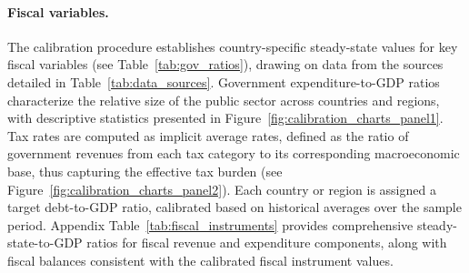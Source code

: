 \documentclass[a4paper,11pt]{article}
\numberwithin{equation}{section}
\begin{document}

\paragraph{Fiscal variables.}
The calibration procedure establishes country-specific steady-state values for key fiscal variables (see Table~\ref{tab:gov_ratios}), drawing on data from the sources detailed in Table~\ref{tab:data_sources}.
Government expenditure-to-GDP ratios characterize the relative size of the public sector across countries and regions, with descriptive statistics presented in Figure~\ref{fig:calibration_charts_panel1}.
Tax rates are computed as implicit average rates, defined as the ratio of government revenues from each tax category to its corresponding macroeconomic base, thus capturing the effective tax burden (see Figure~\ref{fig:calibration_charts_panel2}).
Each country or region is assigned a target debt-to-GDP ratio, calibrated based on historical averages over the sample period.
Appendix Table~\ref{tab:fiscal_instruments} provides comprehensive steady-state-to-GDP ratios for fiscal revenue and expenditure components, along with fiscal balances consistent with the calibrated fiscal instrument values.
\end{document}
